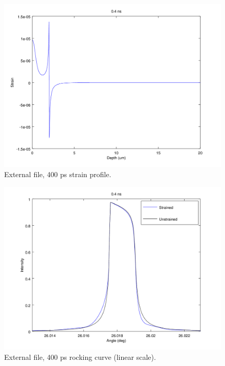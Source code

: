 \documentclass[letterpaper,11pt]{article}
\begin{document}
\begin{figure}
\begin{centering}
\includegraphics[scale=0.65]{400ps_strain.png}
\caption{External file, 400 ps strain profile.}
\label{fig:400ps_strain}
\end{centering}
\end{figure}

\begin{figure}
\begin{centering}
\includegraphics[scale=0.65]{400ps_lin.png}
\caption{External file, 400 ps rocking curve (linear scale).}
\label{fig:400ps_lin}
\end{centering}
\end{figure}
\end{document}
